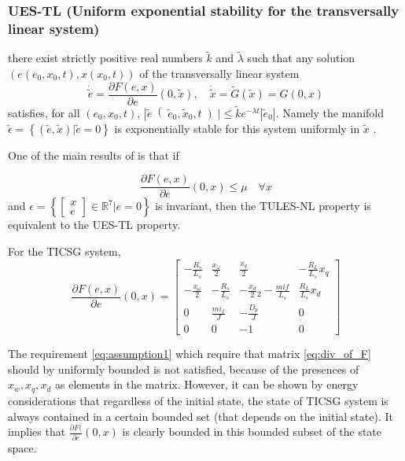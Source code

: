 \documentclass[letterpaper, 10 pt, conference]{ieeeconf}  %
\begin{document}
\subsubsection{UES-TL (Uniform exponential stability for the transversally linear system)}
there exist strictly positive real numbers $\tilde{ k}$ and $\tilde{\lambda}$  such that any solution $\left(e \left(e_0, x_0, t\right), x \left(x_0, t\right)\right)$ of the transversally linear system
$$\dot{\tilde{e}} = \frac{\partial F(e,x)}{\partial e}\left(0,\tilde{x}\right) ,\quad \dot{\tilde{x}} = \tilde{G}  \left( \tilde{x}  \right) =G\left(0,x\right)$$
satisfies, for all $\left(e_0,x_0,t\right)$,   
 $ \left| \tilde{e}\right(\tilde{e}_0,\tilde{x}_0,t \left) \right| \le \tilde{k} e^{-\lambda t} \left| \tilde{e}_0\right|$. Namely the manifold $\tilde{\epsilon}=\left\{\left(\tilde{e},\tilde{x} \right)| \tilde{e} = 0 \right\}$  is exponentially stable for this system uniformly in $\tilde{x}$ .


One of the main results of \cite{AndrieuJayawardhanaPraly} is that if 

\begin{equation}
\frac{\partial F(e,x)}{\partial e}(0,x)\le \mu \quad\forall x  \label{eq:assumption1}
\end{equation}
and 
$\epsilon=\left\{ \left[\begin{array}{c}
x\\
e
\end{array}\right]\in\mathbb{R}^{7}|e=0\right\} $ is invariant, then 
the TULES-NL property is equivalent to the UES-TL property.

For the TICSG system, 
\begin{equation}
\frac{\partial F(e,x)}{\partial e}(0,x)=\left[\begin{array}{cccc}
-\frac{R_{s}}{L_{s}} & \frac{x_{\omega}}{2} & \frac{x_{q}}{2} & -\frac{R_{L}}{L_{s}}x_{q}\\
-\frac{x_{\omega}}{2} & -\frac{R_{s}}{L_{s}} & -\frac{x_{d}}{2}{}_{2}-\frac{mif}{L_{s}} & \frac{R_{L}}{L_{s}}x_{d}\\
0 & \frac{mi_{f}}{J} & -\frac{D_{p}}{J} & 0\\
0 & 0 & -1 & 0
\end{array}\right]\label{eq:div_of_F}
\end{equation}

The requirement \eqref{eq:assumption1}  which require that matrix \eqref{eq:div_of_F} should by uniformly bounded is not satisfied, because of the presences of $x_{w},x_{q},x_{d}$ as elements in the matrix. However, it can be shown by energy considerations  that regardless
of the initial state, the state of TICSG system is always contained in a certain bounded set (that depends on the initial state).
It implies that $\frac{\partial F(}{\partial e}(0,x)$ is clearly bounded in this bounded subset of the state space.
\end{document}
